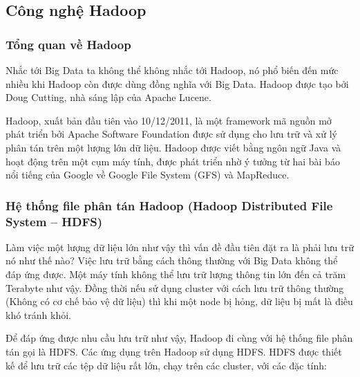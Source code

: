 \documentclass[12pt]{report}
\begin{document}
\subsection{Công nghệ Hadoop}
\subsubsection{Tổng quan về Hadoop}

Nhắc tới Big Data ta không thể không nhắc tới Hadoop, nó phổ biến đến mức nhiều khi Hadoop còn được dùng đồng nghĩa với Big Data. Hadoop được tạo bởi Doug Cutting, nhà sáng lập của Apache Lucene.

Hadoop, xuất bản đầu tiên vào 10/12/2011\cite{hadoop}, là một framework mã nguồn mở phát triển bởi Apache Software Foundation được sử dụng cho lưu trữ và xử lý phân tán trên một lượng lớn dữ liệu. Hadoop được viết bằng ngôn ngữ Java và hoạt động trên một cụm máy tính,  được phát triển nhờ ý tưởng từ hai bài báo nổi tiếng của Google về Google File System (GFS) và MapReduce. 
\newpage

\subsubsection{Hệ thống file phân tán Hadoop (Hadoop Distributed File System – HDFS)}

Làm việc một lượng dữ liệu lớn như vậy thì vấn đề đầu tiên đặt ra là phải lưu trữ nó như thế nào? Việc lưu trữ bằng cách thông thường với Big Data không thể đáp ứng được. Một máy tính không thể lưu trữ lượng thông tin lớn đến cả trăm Terabyte như vậy. Đồng thời nếu sử dụng cluster với cách lưu trữ thông thường (Không có cơ chế bảo vệ dữ liệu) thì khi một node bị hỏng, dữ liệu bị mất là điều khó tránh khỏi.

Để đáp ứng được nhu cầu lưu trữ như vậy, Hadoop đi cùng với hệ thống file phân tán gọi là HDFS. Các ứng dụng trên Hadoop sử dụng HDFS. HDFS được thiết kế để lưu trữ các tệp dữ liệu rất lớn, chạy trên các cluster, với các đặc tính:
\end{document}
